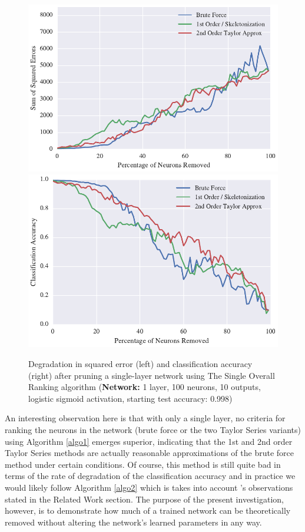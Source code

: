 \begin{figure}[!ht]
\centering
\includegraphics[width=0.49\linewidth]{mnist-acc99-single-pass-method.pdf}
\includegraphics[width=0.49\linewidth]{mnist-acc99-single-pass-accuracy.pdf}
\caption{Degradation in squared error (left) and classification accuracy (right) after pruning a single-layer network using The Single Overall Ranking algorithm (\textbf{Network:} 1 layer, 100 neurons, 10 outputs, logistic sigmoid activation, starting test accuracy: 0.998)}
\label{fig:mnist-single-ranking-single-layer}
\end{figure}

An interesting observation here is that with only a single layer, no criteria for ranking the neurons in the network (brute force or the two Taylor Series variants) using Algorithm \ref{algo1} emerges superior, indicating that the 1st and 2nd order Taylor Series methods are actually reasonable approximations of the brute force method under certain conditions. Of course, this method is still quite bad in terms of the rate of degradation of the classification accuracy and in practice we would likely follow Algorithm \ref{algo2} which is takes into account \cite{mozer1989skeletonization}'s observations stated in the Related Work section. The purpose of the present investigation, however, is to demonstrate how much of a trained network can be theoretically removed without altering the network's learned parameters in any way.

